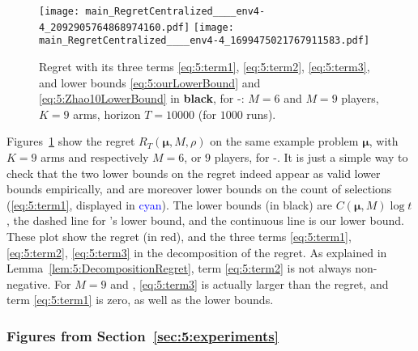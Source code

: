 %
%
\begin{figure}[!h]
    \centering
        \texttt{[image: main\_RegretCentralized\_\_\_\_env4-4\_2092905764868974160.pdf]}
        \texttt{[image: main\_RegretCentralized\_\_\_\_env4-4\_1699475021767911583.pdf]}
    \caption[Multi-player regret with its three terms]{Regret with its three terms \ref{eq:5:term1}, \ref{eq:5:term2}, \ref{eq:5:term3}, and lower bounds \eqref{eq:5:ourLowerBound} and \eqref{eq:5:Zhao10LowerBound} in \textbf{black}, for \Selfish-\klUCB: $M=6$ and $M=9$ players, $K=9$ arms, horizon $T=10000$ (for $1000$ runs).}
    \label{fig:5:MP__M9_K9_T10000_N1000__9_algos__main_RegretCentralized____env6}
\end{figure}



Figures~\ref{fig:5:MP__M9_K9_T10000_N1000__9_algos__main_RegretCentralized____env6}
show the regret $R_T(\boldsymbol{\mu}, M, \rho)$
on the same example problem $\boldsymbol{\mu}$, with $K = 9$ arms and respectively $M = 6$, or $9$ players, for \Selfish-\klUCB.
%
It is just a simple way to check that the two lower bounds on the regret indeed appear as valid lower bounds empirically,
and are moreover lower bounds on the count of selections (\ref{eq:5:term1}, displayed in \textcolor{blue}{cyan}).
%
The lower bounds (in black) are $C(\boldsymbol{\mu}, M) \log t$, the dashed line
for \citeauthor{Zhao10}'s lower bound, and the continuous line is our lower bound.
%
These plot show the regret (in red),
and the three terms \ref{eq:5:term1}, \ref{eq:5:term2}, \ref{eq:5:term3} in the decomposition of the regret.
As explained in Lemma~\ref{lem:5:DecompositionRegret}, term \ref{eq:5:term2} is not always non-negative.
For $M=9$ and \Selfish, \ref{eq:5:term3} is actually larger than the regret,
and term \ref{eq:5:term1} is zero, as well as the lower bounds.


\subsubsection{Figures from Section~\ref{sec:5:experiments}}
\label{app:5:plotsFromSec5}

